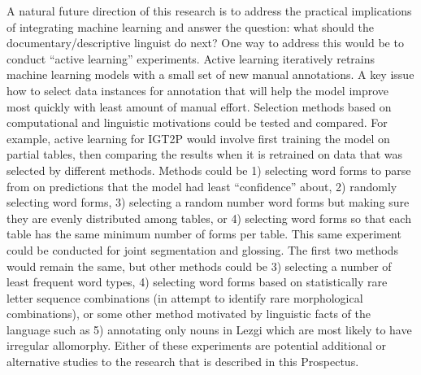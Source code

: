 A natural future direction of this research is to address the practical implications of integrating machine learning and answer the question: what should the documentary/descriptive linguist do next? One way to address this would be to conduct ``active learning'' experiments. Active learning iteratively retrains machine learning models with a small set of new manual annotations. A key issue how to select data instances for annotation that will help the model improve  most quickly with least amount of manual effort. Selection methods based on computational and linguistic motivations could be tested and compared. For example, active learning for IGT2P would involve first training the model on partial tables, then comparing the results when it is retrained on data that was selected by different methods. Methods could be 1) selecting word forms to parse from on predictions that the model had least ``confidence'' about, 2) randomly selecting word forms, 3) selecting a random number word forms but making sure they are evenly distributed among tables, or 4) selecting word forms so that each table has the same minimum number of forms per table. This same experiment could be conducted for joint segmentation and glossing. The first two methods would remain the same, but other methods could be 3) selecting a number of least frequent word types, 4) selecting word forms based on statistically rare letter sequence combinations (in attempt to identify rare morphological combinations), or some other method motivated by linguistic facts of the language such as 5) annotating only nouns in Lezgi which are most likely to have irregular allomorphy. Either of these experiments are potential additional or alternative studies to the research that is described in this Prospectus.
